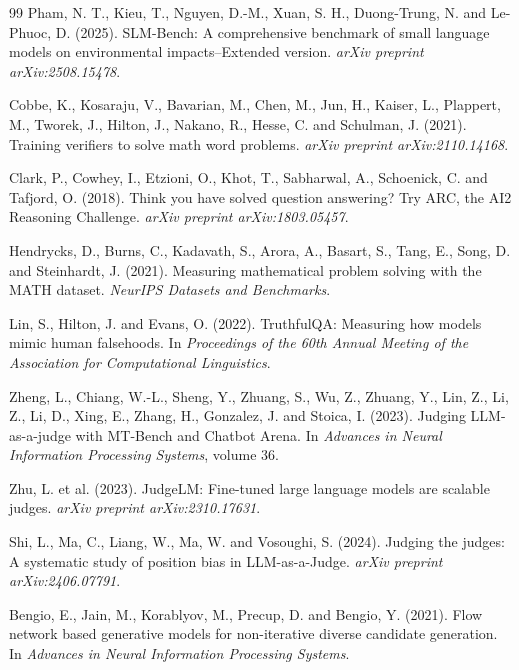 \documentclass[12pt]{article}
\begin{document}
\begin{thebibliography}{99}
Pham, N. T., Kieu, T., Nguyen, D.-M., Xuan, S. H., Duong-Trung, N. and Le-Phuoc, D. (2025).
SLM-Bench: A comprehensive benchmark of small language models on environmental impacts--Extended version.
\textit{arXiv preprint arXiv:2508.15478}.

Cobbe, K., Kosaraju, V., Bavarian, M., Chen, M., Jun, H., Kaiser, L., Plappert, M., Tworek, J., Hilton, J., Nakano, R., Hesse, C. and Schulman, J. (2021).
Training verifiers to solve math word problems.
\textit{arXiv preprint arXiv:2110.14168}.

Clark, P., Cowhey, I., Etzioni, O., Khot, T., Sabharwal, A., Schoenick, C. and Tafjord, O. (2018).
Think you have solved question answering? Try ARC, the AI2 Reasoning Challenge.
\textit{arXiv preprint arXiv:1803.05457}.

Hendrycks, D., Burns, C., Kadavath, S., Arora, A., Basart, S., Tang, E., Song, D. and Steinhardt, J. (2021).
Measuring mathematical problem solving with the MATH dataset.
\textit{NeurIPS Datasets and Benchmarks}.

Lin, S., Hilton, J. and Evans, O. (2022).
TruthfulQA: Measuring how models mimic human falsehoods.
In \textit{Proceedings of the 60th Annual Meeting of the Association for Computational Linguistics}.

Zheng, L., Chiang, W.-L., Sheng, Y., Zhuang, S., Wu, Z., Zhuang, Y., Lin, Z., Li, Z., Li, D., Xing, E., Zhang, H., Gonzalez, J. and Stoica, I. (2023).
Judging LLM-as-a-judge with MT-Bench and Chatbot Arena.
In \textit{Advances in Neural Information Processing Systems}, volume 36.

Zhu, L. et al. (2023).
JudgeLM: Fine-tuned large language models are scalable judges.
\textit{arXiv preprint arXiv:2310.17631}.


Shi, L., Ma, C., Liang, W., Ma, W. and Vosoughi, S. (2024).
Judging the judges: A systematic study of position bias in LLM-as-a-Judge.
\textit{arXiv preprint arXiv:2406.07791}.

Bengio, E., Jain, M., Korablyov, M., Precup, D. and Bengio, Y. (2021).
Flow network based generative models for non-iterative diverse candidate generation.
In \textit{Advances in Neural Information Processing Systems}.

\end{thebibliography}
\end{document}

